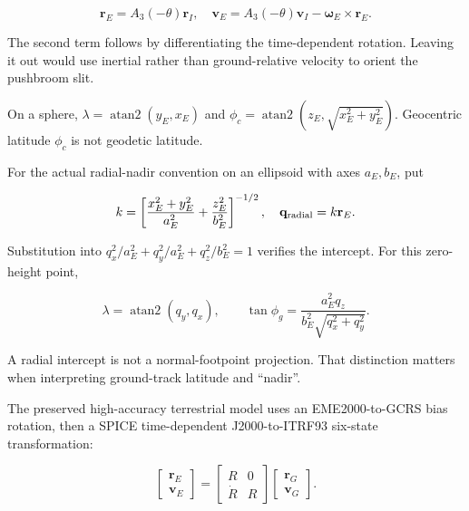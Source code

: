 \documentclass[10pt,a4paper]{article}
\numberwithin{equation}{section}
\begin{document}
\begin{equation}\mathbf r_E=A_3(-\theta)\mathbf r_I,\quad
\mathbf v_E=A_3(-\theta)\mathbf v_I-\boldsymbol\omega_E\times\mathbf r_E.\label{eq:ch5-1}\end{equation}

\begin{sloppypar}The second term follows by differentiating the time-dependent rotation. Leaving it out would use inertial rather than ground-relative velocity to orient the pushbroom slit.\end{sloppypar}


\begin{sloppypar}On a sphere, \(\lambda=\operatorname{atan2}(y_E,x_E)\) and \(\phi_c=\operatorname{atan2}(z_E,\sqrt{x_E^2+y_E^2})\). Geocentric latitude \(\phi_c\) is not geodetic latitude.\end{sloppypar}


\begin{sloppypar}For the actual radial-nadir convention on an ellipsoid with axes \(a_E,b_E\), put\end{sloppypar}


\begin{equation}k=\left[\frac{x_E^2+y_E^2}{a_E^2}+\frac{z_E^2}{b_E^2}\right]^{-1/2},
\quad \mathbf q_{\rm radial}=k\mathbf r_E.\label{eq:ch5-2}\end{equation}

\begin{sloppypar}Substitution into \(q_x^2/a_E^2+q_y^2/a_E^2+q_z^2/b_E^2=1\) verifies the intercept. For this zero-height point,\end{sloppypar}


\begin{equation}\lambda=\operatorname{atan2}(q_y,q_x),\qquad
\tan\phi_g=\frac{a_E^2q_z}{b_E^2\sqrt{q_x^2+q_y^2}}.\label{eq:ch5-3}\end{equation}

\begin{sloppypar}A radial intercept is not a normal-footpoint projection. That distinction matters when interpreting ground-track latitude and ``nadir''.\end{sloppypar}


\begin{sloppypar}The preserved high-accuracy terrestrial model uses an EME2000-to-GCRS bias rotation, then a SPICE time-dependent J2000-to-ITRF93 six-state transformation:\end{sloppypar}


\begin{equation}\begin{bmatrix}\mathbf r_E\\\mathbf v_E\end{bmatrix}
=
\begin{bmatrix}R&0\\\dot R&R\end{bmatrix}
\begin{bmatrix}\mathbf r_G\\\mathbf v_G\end{bmatrix}.\label{eq:ch5-4}\end{equation}
\end{document}
